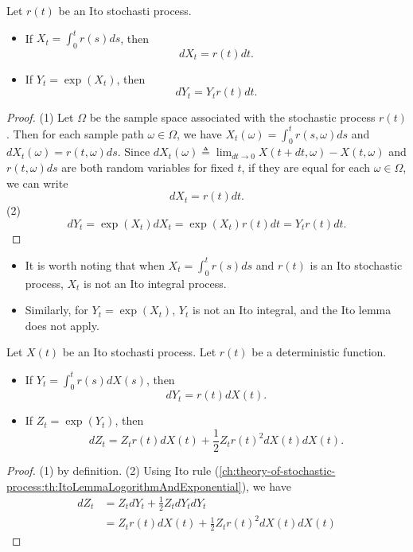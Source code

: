 \begin{refsection}
\begin{lemma}
	Let $r(t)$ be an Ito stochasti process.
	\begin{itemize}
		\item If $X_t = \int_0^t r(s)ds$, then
		$$dX_t = r(t) dt.$$
		\item If $Y_t = \exp(X_t)$, then
		$$dY_t = Y_t r(t)dt.$$
	\end{itemize}	
\end{lemma}
\begin{proof}
	(1) Let $\Omega$ be the sample space associated with the stochastic process $r(t)$. Then for each sample path $\omega\in \Omega$, we have
	$X_t(\omega) = \int_0^t r(s,\omega)ds$ and
	$dX_t(\omega)= r(t,\omega)ds$. 
	Since $dX_t(\omega) \triangleq \lim_{dt\to 0} X(t+dt,\omega)  - X(t,\omega)$ and $r(t,\omega)ds$ are both random variables for fixed $t$, if they are equal for each $\omega \in\Omega$, we can write
	$$dX_t = r(t) dt.$$
	(2) 
	$$dY_t = \exp(X_t)dX_t = \exp(X_t) r(t)dt = Y_t r(t)dt.$$
\end{proof}

\begin{remark}\hfill
	\begin{itemize}
		\item It is worth noting that when $X_t = \int_0^t r(s)ds$ and $r(t)$ is an Ito stochastic process,  $X_t$ is not an Ito integral process.
		\item Similarly, for $Y_t = \exp(X_t)$, $Y_t$ is not an Ito integral, and the Ito lemma does not apply.
	\end{itemize}	
\end{remark}

\begin{lemma}
	Let $X(t)$ be an Ito stochasti process. Let $r(t)$ be a deterministic function.	
	\begin{itemize}
		\item If $Y_t = \int_0^t r(s)dX(s)$, then
		$$dY_t = r(t) dX(t).$$
		\item If $Z_t = \exp(Y_t)$, then
		$$dZ_t = Z_t r(t)dX(t) + \frac{1}{2}Z_t r(t)^2 dX(t)dX(t) .$$
	\end{itemize}
\end{lemma}
\begin{proof}
	(1) by definition.
	(2) Using Ito rule (\autoref{ch:theory-of-stochastic-process:th:ItoLemmaLogorithmAndExponential}), we have
	\begin{align*}
	dZ_t &= Z_tdY_t + \frac{1}{2}Z_tdY_tdY_t \\
	&=Z_t r(t)dX(t) + \frac{1}{2}Z_t r(t)^2 dX(t)dX(t) 
	\end{align*}
\end{proof}



\end{refsection}

